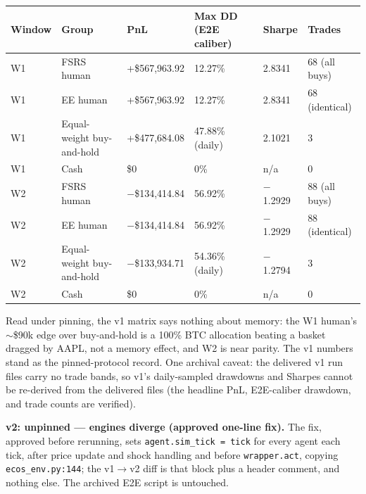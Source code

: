\documentclass[11pt]{article}
\begin{document}
\begin{table}[htbp]
\centering
\begin{tabular}{llllll}
\toprule
\textbf{Window} & \textbf{Group} & \textbf{PnL} & \textbf{Max DD (E2E caliber)} & \textbf{Sharpe} & \textbf{Trades} \\
\midrule
W1 & FSRS human & +\$567,963.92 & 12.27\% & 2.8341 & 68 (all buys) \\
W1 & EE human & +\$567,963.92 & 12.27\% & 2.8341 & 68 (identical) \\
W1 & Equal-weight buy-and-hold & +\$477,684.08 & 47.88\% (daily) & 2.1021 & 3 \\
W1 & Cash & \$0 & 0\% & n/a & 0 \\
W2 & FSRS human & $-$\$134,414.84 & 56.92\% & $-$1.2929 & 88 (all buys) \\
W2 & EE human & $-$\$134,414.84 & 56.92\% & $-$1.2929 & 88 (identical) \\
W2 & Equal-weight buy-and-hold & $-$\$133,934.71 & 54.36\% (daily) & $-$1.2794 & 3 \\
W2 & Cash & \$0 & 0\% & n/a & 0 \\
\bottomrule
\end{tabular}
\end{table}

Read under pinning, the v1 matrix says nothing about memory: the W1 human's $\sim$\$90k edge over buy-and-hold is a 100\% BTC allocation beating a basket dragged by AAPL, not a memory effect, and W2 is near parity. The v1 numbers stand as the pinned-protocol record. One archival caveat: the delivered v1 run files carry no trade bands, so v1's daily-sampled drawdowns and Sharpes cannot be re-derived from the delivered files (the headline PnL, E2E-caliber drawdown, and trade counts are verified).

\textbf{v2: unpinned --- engines diverge (approved one-line fix).} The fix, approved before rerunning, sets \texttt{agent.sim\_tick = tick} for every agent each tick, after price update and shock handling and before \texttt{wrapper.act}, copying \texttt{ecos\_env.py:144}; the v1$\rightarrow$v2 diff is that block plus a header comment, and nothing else. The archived E2E script is untouched.
\end{document}
